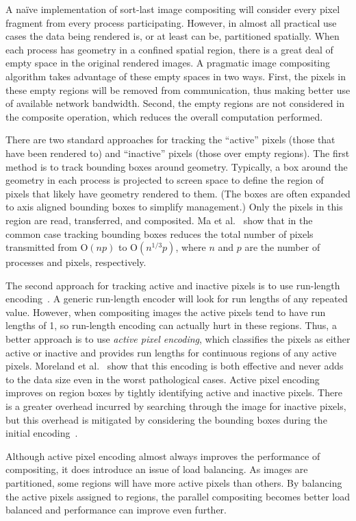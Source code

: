 \documentclass{sig-alternate}
\newcommand*{\lcite}[1]{~\cite{#1}}
\newcommand*{\scite}[1]{~\cite{#1}}
\newcommand{\etal}{et al.}
\newcommand*{\keyterm}[1]{\emph{#1}}
\newcommand{\Oh}{\mathrm{O}}
\begin{document}
A na\"{i}ve implementation of sort-last image compositing will consider
every pixel fragment from every process participating.  However, in almost
all practical use cases the data being rendered is, or at least can be,
partitioned spatially.  When each process has geometry in a confined
spatial region, there is a great deal of empty space in the original
rendered images.  A pragmatic image compositing algorithm takes advantage
of these empty spaces in two ways.  First, the pixels in these empty
regions will be removed from communication, thus making better use of
available network bandwidth.  Second, the empty regions are not considered
in the composite operation, which reduces the overall computation
performed.

There are two standard approaches for tracking the ``active'' pixels (those
that have been rendered to) and ``inactive'' pixels (those over empty
regions).  The first method is to track bounding boxes around geometry.
Typically, a box around the geometry in each process is projected to screen
space to define the region of pixels that likely have geometry rendered to
them.  (The boxes are often expanded to axis aligned bounding boxes to
simplify management.)  Only the pixels in this region are read,
transferred, and composited.  Ma \etal\scite{BinarySwap2} show that in the
common case tracking bounding boxes reduces the total number of pixels
transmitted from $\Oh(n p)$ to $\Oh(n^{1/3} p)$, where $n$ and $p$ are the
number of processes and pixels, respectively.

The second approach for tracking active and inactive pixels is to use
run-length encoding\lcite{Ahrens1998}.  A generic run-length encoder
will look for run lengths of any repeated value.  However, when compositing
images the active pixels tend to have run lengths of 1, so run-length
encoding can actually hurt in these regions.  Thus, a better approach is to
use \keyterm{active pixel encoding}, which classifies the pixels as either
active or inactive and provides run lengths for continuous regions of any
active pixels.  Moreland \etal\scite{Moreland2001} show that this
encoding is both effective and never adds to the data size even in the
worst pathological cases.  Active pixel encoding improves on region boxes
by tightly identifying active and inactive pixels.  There is a greater
overhead incurred by searching through the image for inactive pixels, but
this overhead is mitigated by considering the bounding boxes during the
initial encoding\lcite{Yang1999}.

Although active pixel encoding almost always improves the performance of
compositing, it does introduce an issue of load balancing.  As images are
partitioned, some regions will have more active pixels than others.  By
balancing the active pixels assigned to regions, the parallel compositing
becomes better load balanced and performance can improve even further.
\end{document}
